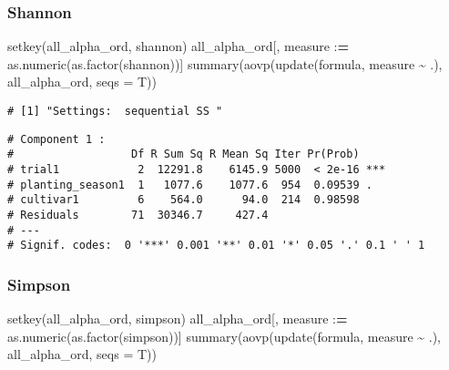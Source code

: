 \documentclass[
]{article}
\newenvironment{Shaded}{\begin{snugshade}}{\end{snugshade}}
\newcommand{\AttributeTok}[1]{\textcolor[rgb]{0.77,0.63,0.00}{#1}}
\newcommand{\ErrorTok}[1]{\textcolor[rgb]{0.64,0.00,0.00}{\textbf{#1}}}
\newcommand{\FunctionTok}[1]{\textcolor[rgb]{0.00,0.00,0.00}{#1}}
\newcommand{\NormalTok}[1]{#1}
\newcommand{\SpecialCharTok}[1]{\textcolor[rgb]{0.00,0.00,0.00}{#1}}
\begin{document}
\hypertarget{shannon}{%
\subsubsection{Shannon}\label{shannon}}

\begin{Shaded}
\begin{Highlighting}[]
\FunctionTok{setkey}\NormalTok{(all\_alpha\_ord, shannon)}
\NormalTok{all\_alpha\_ord[, measure }\SpecialCharTok{:}\ErrorTok{=} \FunctionTok{as.numeric}\NormalTok{(}\FunctionTok{as.factor}\NormalTok{(shannon))]}
\FunctionTok{summary}\NormalTok{(}\FunctionTok{aovp}\NormalTok{(}\FunctionTok{update}\NormalTok{(formula, measure }\SpecialCharTok{\textasciitilde{}}\NormalTok{ .), all\_alpha\_ord, }\AttributeTok{seqs =}\NormalTok{ T))}
\end{Highlighting}
\end{Shaded}

\begin{verbatim}
# [1] "Settings:  sequential SS "
\end{verbatim}

\begin{verbatim}
# Component 1 :
#                  Df R Sum Sq R Mean Sq Iter Pr(Prob)    
# trial1            2  12291.8    6145.9 5000  < 2e-16 ***
# planting_season1  1   1077.6    1077.6  954  0.09539 .  
# cultivar1         6    564.0      94.0  214  0.98598    
# Residuals        71  30346.7     427.4                  
# ---
# Signif. codes:  0 '***' 0.001 '**' 0.01 '*' 0.05 '.' 0.1 ' ' 1
\end{verbatim}

\hypertarget{simpson}{%
\subsubsection{Simpson}\label{simpson}}

\begin{Shaded}
\begin{Highlighting}[]
\FunctionTok{setkey}\NormalTok{(all\_alpha\_ord, simpson)}
\NormalTok{all\_alpha\_ord[, measure }\SpecialCharTok{:}\ErrorTok{=} \FunctionTok{as.numeric}\NormalTok{(}\FunctionTok{as.factor}\NormalTok{(simpson))]}
\FunctionTok{summary}\NormalTok{(}\FunctionTok{aovp}\NormalTok{(}\FunctionTok{update}\NormalTok{(formula, measure }\SpecialCharTok{\textasciitilde{}}\NormalTok{ .), all\_alpha\_ord, }\AttributeTok{seqs =}\NormalTok{ T))}
\end{Highlighting}
\end{Shaded}
\end{document}
